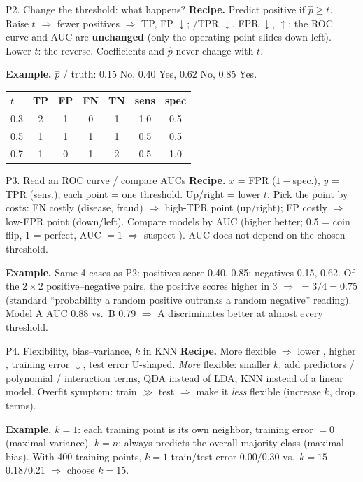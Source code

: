 \begin{topic}{P2. Change the threshold: what happens? }
\textbf{Recipe.} Predict positive if $\hat p\ge t$. Raise $t$ $\Rightarrow$ fewer positives $\Rightarrow$ TP, FP
$\downarrow$; /TPR $\downarrow$, FPR $\downarrow$,  $\uparrow$; the
ROC curve and AUC are \textbf{unchanged} (only the operating point slides down-left). Lower $t$: the reverse.
Coefficients and $\hat p$ never change with $t$.
\par\textbf{Example.} $\hat p$ / truth: 0.15 No, 0.40 Yes, 0.62 No, 0.85 Yes.\\
{\footnotesize\begin{tabular}{@{}l c c c c c c@{}}
$t$ & TP & FP & FN & TN & sens & spec\\ \midrule
0.3 & 2 & 1 & 0 & 1 & 1.0 & 0.5\\
0.5 & 1 & 1 & 1 & 1 & 0.5 & 0.5\\
0.7 & 1 & 0 & 1 & 2 & 0.5 & 1.0\\
\end{tabular}}
\end{topic}

\begin{topic}{P3. Read an ROC curve / compare AUCs }
\textbf{Recipe.} $x$ = FPR ($1-$spec.), $y$ = TPR (sens.); each point = one threshold. Up/right = lower $t$.
Pick the point by costs: FN costly (disease, fraud) $\Rightarrow$ high-TPR point (up/right); FP costly $\Rightarrow$
low-FPR point (down/left). Compare models by AUC (higher better; 0.5 = coin flip, 1 = perfect, AUC $=1$ $\Rightarrow$
suspect ). AUC does not depend on the chosen threshold.
\par\textbf{Example.} Same 4 cases as P2: positives score 0.40, 0.85; negatives 0.15, 0.62. Of the $2\times2$
positive--negative pairs, the positive scores higher in 3 $\Rightarrow$  $=3/4=0.75$ (standard ``probability a
random positive outranks a random negative'' reading). Model A AUC 0.88 vs.\ B 0.79 $\Rightarrow$ A
discriminates better at almost every threshold.
\end{topic}

\begin{topic}{P4. Flexibility, bias--variance, $k$ in KNN }
\textbf{Recipe.} More flexible $\Rightarrow$ lower , higher , training error $\downarrow$, test
error U-shaped. \emph{More} flexible: smaller $k$, add predictors / polynomial / interaction terms, QDA instead of
LDA, KNN instead of a linear model. Overfit symptom: train $\gg$ test $\Rightarrow$ make it \emph{less} flexible
(increase $k$, drop terms).
\par\textbf{Example.} $k=1$: each training point is its own neighbor, training error $=0$ (maximal variance).
$k=n$: always predicts the overall majority class (maximal bias). With 400 training points, $k=1$
train/test error 0.00/0.30 vs.\ $k=15$ 0.18/0.21 $\Rightarrow$ choose $k=15$.
\end{topic}

